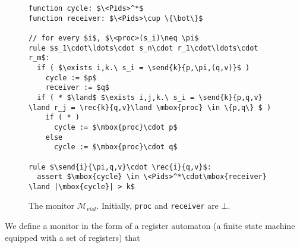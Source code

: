 \begin{figure}
\begin{center}
\centering
\begin{lstlisting}
function cycle: $\<Pids>^*$
function receiver: $\<Pids>\cup \{\bot\}$

// for every $i$, $\<proc>(s_i)\neq \pi$
rule $s_1\cdot\ldots\cdot s_n\cdot r_1\cdot\ldots\cdot r_m$:
  if ( $\exists i,k.\ s_i = \send{k}{p,\pi,(q,v)}$ )
    cycle := $p$
    receiver := $q$
  if ( * $\land$ $\exists i,j,k.\ s_i = \send{k}{p,q,v} \land r_j = \rec{k}{q,v}\land \mbox{proc} \in \{p,q\} $ )
    if ( * )
      cycle := $\mbox{proc}\cdot p$
    else 
      cycle := $\mbox{proc}\cdot q$

rule $\send{i}{\pi,q,v}\cdot \rec{i}{q,v}$:
  assert $\mbox{cycle} \in \<Pids>^*\cdot\mbox{receiver} \land |\mbox{cycle}| > k$
\end{lstlisting}
\end{center}
\caption{The monitor $\mathcal{M}_{\mathit{viol}}$. Initially, {\tt proc} and {\tt receiver} are $\bot$.}
\label{fig:mon_viol}
\end{figure}



We define a monitor in the form of a register automaton (a finite state machine equipped with a set of registers)
that 